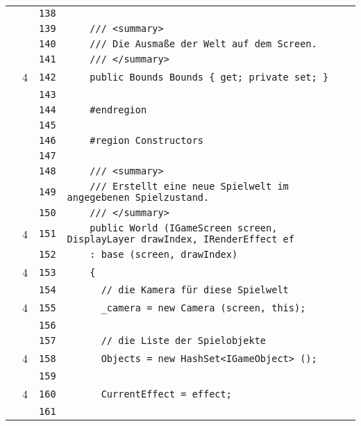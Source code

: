 \documentclass[a4paper,10pt]{article}
\begin{document}
\begin{longtable}[l]{lrrl}
\cellcolor{gray} &  & \verb~138~ & \verb~~\\
\cellcolor{gray} &  & \verb~139~ & \verb~    /// <summary>~\\
\cellcolor{gray} &  & \verb~140~ & \verb~    /// Die Ausmaße der Welt auf dem Screen.~\\
\cellcolor{gray} &  & \verb~141~ & \verb~    /// </summary>~\\
\cellcolor{green} & 4 & \verb~142~ & \verb~    public Bounds Bounds { get; private set; }~\\
\cellcolor{gray} &  & \verb~143~ & \verb~~\\
\cellcolor{gray} &  & \verb~144~ & \verb~    #endregion~\\
\cellcolor{gray} &  & \verb~145~ & \verb~~\\
\cellcolor{gray} &  & \verb~146~ & \verb~    #region Constructors~\\
\cellcolor{gray} &  & \verb~147~ & \verb~~\\
\cellcolor{gray} &  & \verb~148~ & \verb~    /// <summary>~\\
\cellcolor{gray} &  & \verb~149~ & \verb~    /// Erstellt eine neue Spielwelt im angegebenen Spielzustand.~\\
\cellcolor{gray} &  & \verb~150~ & \verb~    /// </summary>~\\
\cellcolor{green} & 4 & \verb~151~ & \verb~    public World (IGameScreen screen, DisplayLayer drawIndex, IRenderEffect ef~\\
\cellcolor{gray} &  & \verb~152~ & \verb~    : base (screen, drawIndex)~\\
\cellcolor{green} & 4 & \verb~153~ & \verb~    {~\\
\cellcolor{gray} &  & \verb~154~ & \verb~      // die Kamera für diese Spielwelt~\\
\cellcolor{green} & 4 & \verb~155~ & \verb~      _camera = new Camera (screen, this);~\\
\cellcolor{gray} &  & \verb~156~ & \verb~~\\
\cellcolor{gray} &  & \verb~157~ & \verb~      // die Liste der Spielobjekte~\\
\cellcolor{green} & 4 & \verb~158~ & \verb~      Objects = new HashSet<IGameObject> ();~\\
\cellcolor{gray} &  & \verb~159~ & \verb~~\\
\cellcolor{green} & 4 & \verb~160~ & \verb~      CurrentEffect = effect;~\\
\cellcolor{gray} &  & \verb~161~ & \verb~~\\

\end{longtable}
\end{document}
